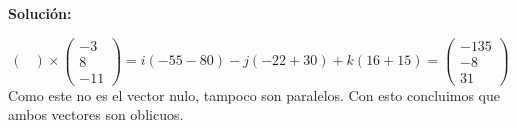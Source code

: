 \documentclass[12pt]{article}
\newenvironment{solucion}
{\begin{mdframed}[backgroundcolor=black!10]
		{\bf Solución:}\\
	}
	{
	\end{mdframed}
}
\newenvironment{preguntas}
{\begin{enumerate}\itemsep12pt
	}
	{
	\end{enumerate}
}
\begin{document}
\begin{preguntas}
\begin{solucion}
\begin{enumerate}[a)]
$$\begin{pmatrix}
			\end{pmatrix} \times
			\begin{pmatrix}
			-3\\
			8\\
			-11
			\end{pmatrix} = i(-55 -80) - j (-22 +30) +k(16 + 15) = \begin{pmatrix}
			-135\\
			-8\\
			31
			\end{pmatrix}$$
			Como este no es el vector nulo, tampoco son paralelos. Con esto concluimos que ambos vectores son oblicuos.
\end{enumerate}
\end{solucion}
\end{preguntas}
\end{document}
